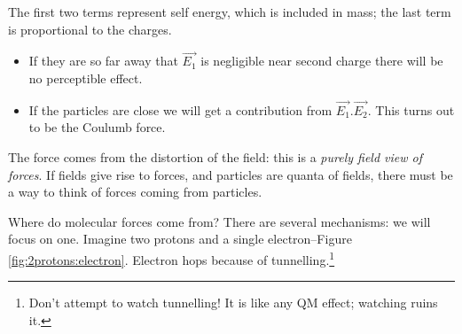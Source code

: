 \documentclass[]{article}
\begin{document}
The first two terms represent self energy, which is included in mass; the last term is proportional to the charges.
\begin{itemize}
	\item  If they are so far away that $\vec{E_1}$ is negligible near second charge there will be no perceptible effect.
	\item If the particles are close we will get a contribution from $\vec{E_1}.\vec{E_2}$. This turns out to be the Coulumb force. 
\end{itemize}

The force comes from the distortion of the field: this is a \emph{purely field view of forces}. If fields give rise to forces, and particles are quanta of fields, there must be a way to think of forces coming from particles.

Where do molecular forces come from? There are several mechanisms: we will focus on one. Imagine two protons and a single electron--Figure \ref{fig:2protons:electron}. Electron hops because of tunnelling.\footnote{Don't attempt to watch tunnelling! It is like any QM effect; watching ruins it.}
\end{document}
